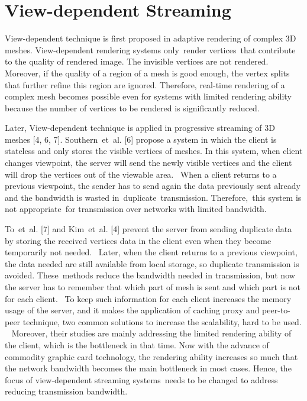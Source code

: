 \documentclass[11pt, a4paper]{report}
\begin{document}
    \section{View-dependent Streaming}
    \label{s:intro:view_dependent}
    View-dependent technique is first proposed in adaptive rendering of complex 3D meshes. 
    View-dependent rendering systems only render vertices that contribute
    to the quality of rendered image. 
    The invisible vertices are not rendered. 
    Moreover, if the quality of a region of a mesh is good enough, 
    the vertex splits that further refine this region are ignored. 
    Therefore, real-time rendering of a complex mesh becomes possible 
    even for systems with limited rendering ability because the number
    of vertices to be rendered is significantly reduced. 

    Later, View-dependent technique is applied in progressive streaming of 3D meshes [4, 6, 7].
    Southern et al. [6] propose a system in which the client is stateless 
    and only stores the visible vertices of meshes. 
    In this system, when client changes viewpoint, 
    the server will send the newly visible vertices and the client 
    will drop the vertices out of the viewable area. 
    When a client returns to a previous viewpoint, 
    the sender has to send again the data previously sent already 
    and the bandwidth is wasted in duplicate transmission. 
    Therefore, this system is not appropriate for transmission
    over networks with limited bandwidth. 

    To et al. [7] and Kim et al. [4] prevent the server 
    from sending duplicate data by storing the received vertices data 
    in the client even when they become temporarily not needed. 
    Later, when the client returns to a previous viewpoint, 
    the data needed are still available from local storage, 
    so duplicate transmission is avoided. 
    These methods reduce the bandwidth needed in transmission, 
    but now the server has to remember that which part of mesh is sent
    and which part is not for each client. 
    To keep such information for each client increases the memory usage of the server, 
    and it makes the application of caching proxy and peer-to-peer technique, 
    two common solutions to increase the scalability, hard to be used.  
    Moreover, their studies are mainly addressing the limited rendering ability of the client,
    which is the bottleneck in that time. 
    Now with the advance of commodity graphic card technology, 
    the rendering ability increases so much that the network bandwidth becomes the main bottleneck
    in most cases. Hence, the focus of view-dependent streaming systems needs to be changed
    to address reducing transmission bandwidth.
\end{document}
